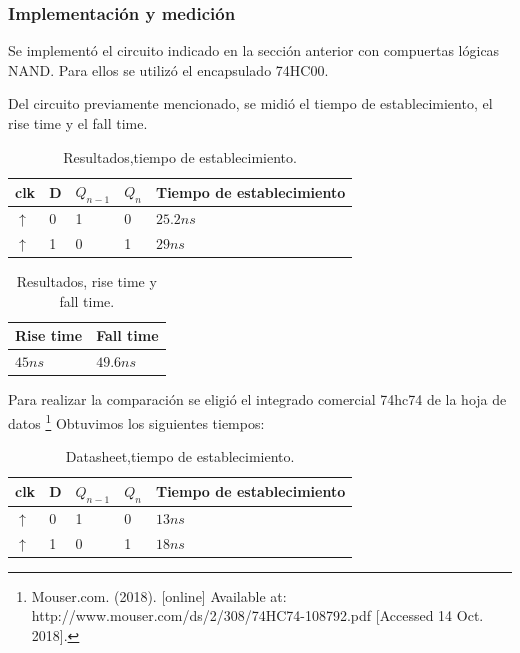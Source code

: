 \documentclass[../../e3_tp2_main.tex]{subfiles}
\begin{document}
\subsubsection{Implementación y medici\'on}
Se implementó el circuito indicado en la sección anterior con compuertas lógicas NAND. Para ellos se utilizó el encapsulado 74HC00.\par

Del circuito previamente mencionado, se midió el tiempo de establecimiento, el rise time y el fall time. 

\begin{table}[h]
\begin{center}
\begin{tabular}{|l|l|l|l|l|}
\hline
clk& D & $Q_{n-1}$ & $Q_n$ &Tiempo de establecimiento\\
\hline \hline
$\uparrow$ &0& 1&0&$25.2 n s$  \\ \hline
$\uparrow$ &1&0&1&$29 n s$  \\ \hline
\end{tabular}
\caption{Resultados,tiempo de establecimiento.} 
\end{center}
\end{table}

\begin{table}[h]
\begin{center}
\begin{tabular}{|l|l|}
\hline
Rise time& Fall time \\
\hline \hline
$45 n s$  & $49.6 n s$ \\ \hline
\end{tabular}
\caption{Resultados, rise time y fall time.} 
\end{center}
\end{table}

Para realizar la comparación se eligió el integrado comercial 74hc74 de la hoja de datos
\footnote{Mouser.com. (2018). [online] Available at: http://www.mouser.com/ds/2/308/74HC74-108792.pdf [Accessed 14 Oct. 2018].}
 Obtuvimos los siguientes tiempos:

\begin{table}[H]
\begin{center}
\begin{tabular}{|l|l|l|l|l|}
\hline
clk& D & $Q_{n-1}$ & $Q_n$ &Tiempo de establecimiento\\
\hline \hline
$\uparrow$ &0& 1&0&$13 n s$  \\ \hline
$\uparrow$ &1&0&1&$18 n s$  \\ \hline
\end{tabular}
\caption{Datasheet,tiempo de establecimiento.} 
\end{center}
\end{table}
\end{document}
